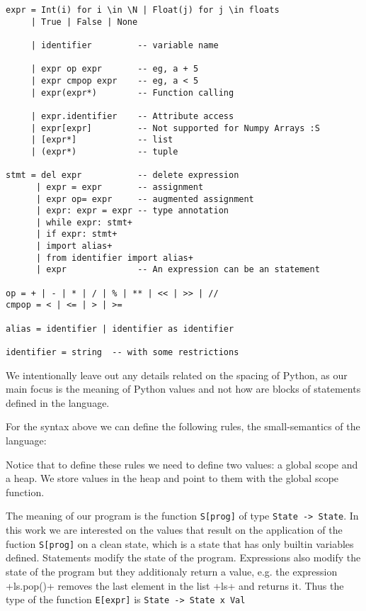 \begin{verbatim}
expr = Int(i) for i \in \N | Float(j) for j \in floats
     | True | False | None

     | identifier         -- variable name

     | expr op expr       -- eg, a + 5
     | expr cmpop expr    -- eg, a < 5
     | expr(expr*)        -- Function calling

     | expr.identifier    -- Attribute access
     | expr[expr]         -- Not supported for Numpy Arrays :S
     | [expr*]            -- list
     | (expr*)            -- tuple

stmt = del expr           -- delete expression
      | expr = expr       -- assignment
      | expr op= expr     -- augmented assignment
      | expr: expr = expr -- type annotation
      | while expr: stmt+
      | if expr: stmt+
      | import alias+
      | from identifier import alias+
      | expr              -- An expression can be an statement

op = + | - | * | / | % | ** | << | >> | //
cmpop = < | <= | > | >=

alias = identifier | identifier as identifier

identifier = string  -- with some restrictions
\end{verbatim}

We intentionally leave out any details related on the spacing of Python, as our main focus
is the meaning of Python values and not how are blocks of statements defined in the
language.

For the syntax above we can define the following rules, the small-semantics of the
language:


Notice that to define these rules we need to define two values: a global scope and a heap.
We store values in the heap and point to them with the global scope function.

The meaning of our program is the function \verb+S[prog]+ of type \verb+State -> State+.
In this work we are interested on the values that result on the application of the fuction
\verb+S[prog]+ on a clean state, which is a state that has only builtin variables defined.
Statements modify the state of the program. Expressions also modify the state of the
program but they additionaly return a value, e.g. the expression \pycode+ls.pop()+ removes
the last element in the list \pycode+ls+ and returns it. Thus the type of the function
\verb+E[expr]+ is \verb+State -> State x Val+

